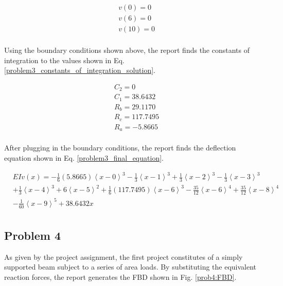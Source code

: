 \documentclass[a4paper]{article}
\begin{document}
\begin{equation}
\begin{split}
	& v(0) = 0 \\
	& v(6) = 0 \\
	& v(10) = 0 \\
\end{split}
\label{problem3_constants_of_integration}
\end{equation}

Using the boundary conditions shown above, the report finds the constants of integration to the values shown in Eq. \ref{problem3_constants_of_integration_solution}.

\begin{equation}
\begin{split}
	& C_2 = 0 \\
	& C_1 = 38.6432 \\
	& R_b = 29.1170 \\
	& R_c = 117.7495\\
	& R_a = -5.8665 \\
\end{split}
\label{problem3_constants_of_integration_solution}
\end{equation}

After plugging in the boundary conditions, the report finds the deflection equation shown in Eq. \ref{problem3_final_equation}.

\begin{equation}
\begin{split}
  & EI v(x) = -\frac{1}{6}\left(5.8665\right)\left<x-0\right>^3 - \frac{1}{3}\left<x-1\right>^3 +  \frac{1}{3}\left<x-2\right>^3 - \frac{1}{3}\left<x-3\right>^3 \\
& +  \frac{1}{3}\left<x-4\right>^3 + 6\left<x-5\right>^2 + \frac{1}{6}\left(117.7495\right)\left<x-6\right>^3 -  \frac{35}{12}\left<x-6\right>^4 + \frac{35}{12}\left<x-8\right>^4  \\
& - \frac{1}{60}\left<x-9\right>^5 + 38.6432x \\
\end{split}
\label{problem3_final_equation}
\end{equation}





\subsection{Problem 4}

As given by the project assignment, the first project constitutes of a simply supported beam subject to a series of area loads. By substituting the equivalent reaction forces, the report generates the FBD shown in Fig. \ref{prob4:FBD}.
\end{document}
